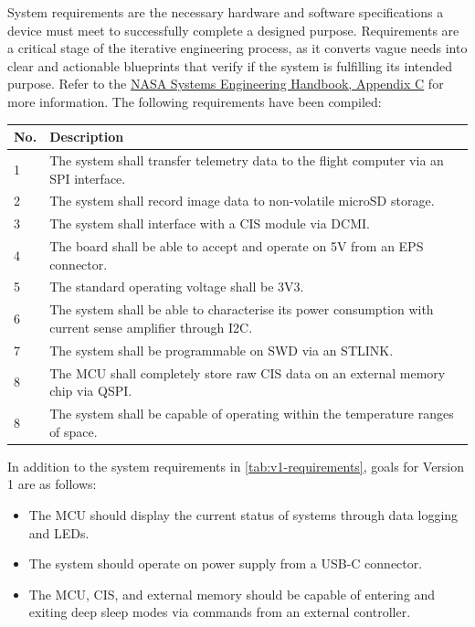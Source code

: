 System requirements are the necessary hardware and software specifications a device must meet to successfully complete a designed purpose. Requirements are a critical stage of the iterative engineering process, as it converts vague needs into clear and actionable blueprints that verify if the system is fulfilling its intended purpose. Refer to the \href{https://www.nasa.gov/reference/system-engineering-handbook-appendix/#hds-sidebar-nav-3}{NASA Systems Engineering Handbook, Appendix  C} for more information. The following requirements have been compiled:

\begin{indentedtable}
    \centering
    \begin{tabular}{|l|p{12cm}|}
        \hline
        \textbf{No.} & \textbf{Description} \\
        \hline
        1 & The system shall transfer telemetry data to the flight computer via an SPI interface. \\
        \hline
        2 & The system shall record image data to non-volatile microSD storage. \\
        \hline
        3 & The system shall interface with a CIS module via DCMI. \\
        \hline
        4 & The board shall be able to accept and operate on 5V from an EPS connector. \\
        \hline
        5 & The standard operating voltage shall be 3V3. \\
        \hline
        6 & The system shall be able to characterise its power consumption with current sense amplifier through I2C. \\
        \hline
        7 & The system shall be programmable on SWD via an STLINK. \\
        \hline
        8 & The MCU shall completely store raw CIS data on an external memory chip via QSPI. \\
        \hline
        8 & The system shall be capable of operating within the temperature ranges of space. \\
        \hline
    \end{tabular}
    \caption{C2Sv1 system requirements.}
    \label{tab:v1-requirements}
\end{indentedtable}

In addition to the system requirements in \autoref{tab:v1-requirements}, goals for Version 1 are as follows:

\begin{itemize}
    \item The MCU should display the current status of systems through data logging and LEDs.
    \item The system should operate on power supply from a USB-C connector.
    \item The MCU, CIS, and external memory should be capable of entering and exiting deep sleep modes via commands from an external controller.
\end{itemize}